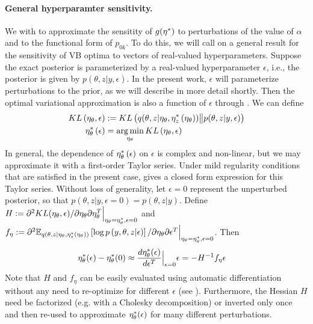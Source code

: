 
\paragraph{General hyperparamter sensitivity.}
%
We with to approximate the sensitity of $g(\eta^{*})$ to perturbations of the
value of $\alpha$ and to the functional form of $p_{0k}$.  To do this, we will
call on a general result for the sensitivity of VB optima to vectors of
real-valued hyperparameters.  Suppose the exact posterior is parameterized by a
real-valued hyperparameter $\epsilon$, i.e., the posterior is given by
$p\left(\theta, z \vert y, \epsilon\right)$. In the present work, $\epsilon$
will parameterize perturbations to the prior, as we will describe in more detail
shortly.  Then the optimal variational approximation is also a function of
$\epsilon$ through .  We can define
%
\begin{align}
KL\left(\eta_\theta, \epsilon\right) &:=
    KL\left(q(\theta, z \vert \eta_\theta, \eta_z^{*}\left(\eta_\theta\right))
    \big\| p(\theta, z | y, \epsilon) \right) \\
\eta_\theta^{*}\left(\epsilon\right) &=
    \operatorname*{arg\,min}_{\eta_\theta} KL\left(\eta_\theta, \epsilon\right)
    \label{eq:pert_kl_objective}
\end{align}
%
In general, the dependence of $\eta_\theta^{*}\left(\epsilon\right)$ on $\epsilon$ is
complex and non-linear, but we may approximate it with a first-order Taylor
series.
Under mild regularity conditions that are satisfied in the present case,
\citet[Theorem 2]{giordano:2017:covariances} gives a closed form
expression for this Taylor series.
Without loss of generality, let $\epsilon=0$ represent the unperturbed
posterior, so that $p\left(\theta, z \vert y, \epsilon=0\right) = p\left(\theta,
z \vert y \right)$.
Define
$H := \partial^2 KL(\eta_\theta, \epsilon) /
    \partial \eta_\theta \partial \eta_\theta^T
    \Big\rvert_{\eta_\theta = \eta_\theta^{*}, \epsilon = 0}$ and
$f_\eta := \partial^2
    \mathbb{E}_{q\left(\theta, z \vert \eta_\theta, \eta_z^{*}(\eta_\theta)\right)} \left[ \log p\left(y, \theta, z \vert \epsilon \right) \right]
    / \partial \eta_\theta \partial \epsilon^T
    \Big\rvert_{\eta_\theta = \eta_\theta^{*}, \epsilon = 0}$.
Then
%
\begin{align}
\eta_\theta^{*}(\epsilon)  -  \eta_\theta^{*}(0) &\approx
\frac{d \eta_\theta^{*}(\epsilon)}{d\epsilon^T}\Big|_{\epsilon=0} \epsilon =
- H^{-1} f_\eta \epsilon
\label{eq:our_approximation}
\end{align}
%
Note that $H$ and $f_\eta$ can be easily evaluated using automatic
differentiation without any need to re-optimize for different $\epsilon$
\citep{maclaurin:2015:autograd} (see ).  Furthermore,
the Hessian $H$ need be factorized (e.g. with a Cholesky decomposition) or
inverted only once and then re-used to approximate $\eta_\theta^{*}(\epsilon)$ for
many different perturbations.
